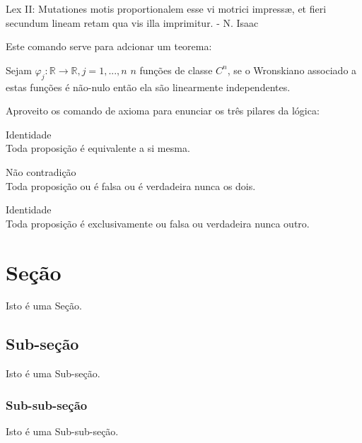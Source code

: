 \begin{citacao}
    Lex II: Mutationes motis proportionalem esse vi motrici impressæ, et fieri secundum lineam retam qua vis illa imprimitur. - N. Isaac\cite{principia1}
\end{citacao}

Este comando serve para adcionar um teorema:

\begin{teorema}
    Sejam $\varphi_j : \mathbb{R} \rightarrow \mathbb{R}, j = 1, ..., n$\: $n$ funções de classe $C^n$, se o Wronskiano 
    associado a estas funções é não-nulo então ela são linearmente independentes.
\end{teorema}

Aproveito os comando de axioma para enunciar os três pilares da lógica:

\begin{axioma}Identidade\\
    Toda proposição é equivalente a si mesma.
\end{axioma}

\begin{axioma}Não contradição\\
    Toda proposição ou é falsa ou é verdadeira nunca os dois.
\end{axioma}

\begin{axioma}Identidade\\
    Toda proposição é exclusivamente ou falsa ou verdadeira nunca outro.
\end{axioma}

\section{Seção}

Isto é uma Seção.

\subsection{Sub-seção}

Isto é uma Sub-seção.

\subsubsection{Sub-sub-seção}

Isto é uma Sub-sub-seção.